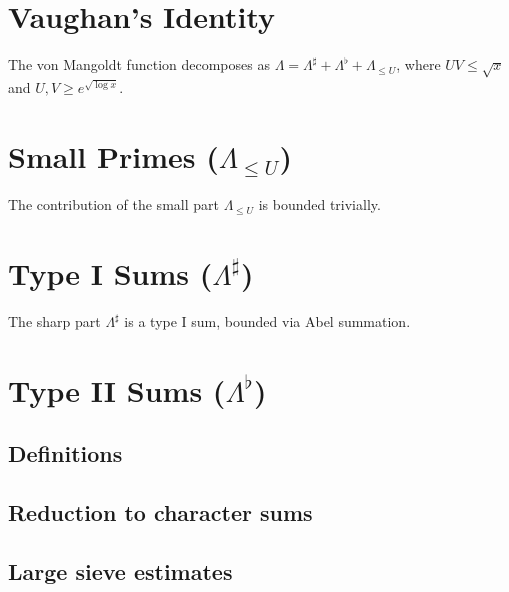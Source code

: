 \section{Vaughan's Identity}

The von Mangoldt function decomposes as $\Lambda = \Lambda^\sharp + \Lambda^\flat + \Lambda_{\le U}$,
where $UV \le \sqrt{x}$ and $U, V \ge e^{\sqrt{\log x}}$.


\section{Small Primes (\texorpdfstring{$\Lambda_{\le U}$}{Lambda le U})}

The contribution of the small part $\Lambda_{\le U}$ is bounded trivially.


\section{Type I Sums (\texorpdfstring{$\Lambda^\sharp$}{Lambda sharp})}

The sharp part $\Lambda^\sharp$ is a type I sum, bounded via Abel summation.


\section{Type II Sums (\texorpdfstring{$\Lambda^\flat$}{Lambda flat})}

\subsection{Definitions}


\subsection{Reduction to character sums}


\subsection{Large sieve estimates}

